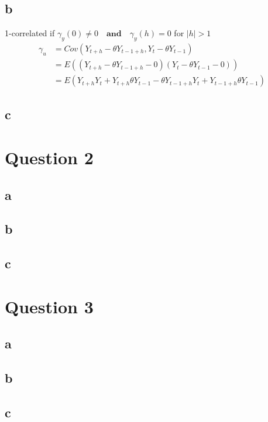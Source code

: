 \documentclass{article}
\begin{document}
\subsection{b}
1-correlated if $\gamma_y(0) \neq 0 \quad \textbf{and} \quad \gamma_y(h) = 0$ for $|h| > 1$
\begin{align}
	\gamma_u &= Cov(Y_{t+h} - \theta Y_{t-1+h}, Y_{t} - \theta Y_{t-1}) \\
		   &= E((Y_{t+h} - \theta Y_{t-1+h} - 0)(Y_{t} - \theta Y_{t-1} - 0)) \\
		   &= E(Y_{t+h}Y_t + Y_{t+h}\theta Y_{t-1} - \theta Y_{t-1+h} Y_t + Y_{t-1+h} \theta Y_{t-1})
\end{align}
\subsection{c}
\section{Question 2}
\subsection{a}
\subsection{b}
\subsection{c}
\section{Question 3}
\subsection{a}
\subsection{b}
\subsection{c}
\end{document}
